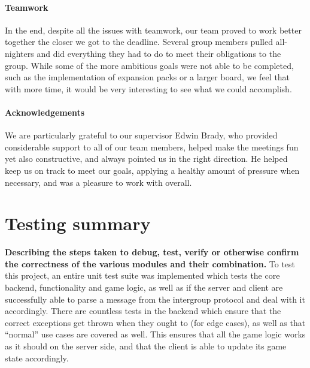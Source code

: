 \documentclass[a4paper,doc,draftfirst]{apa6}
\begin{document}
\paragraph{Teamwork}
In the end, despite all the issues with teamwork, our team proved to work better together the closer we got to the deadline. Several group members pulled all-nighters and did everything they had to do to meet their obligations to the group. While some of the more ambitious goals were not able to be completed, such as the implementation of expansion packs or a larger board, we feel that with more time, it would be very interesting to see what we could accomplish.   

\paragraph{Acknowledgements}
We are particularly grateful to our supervisor Edwin Brady, who provided considerable support to all of our team members, helped make the meetings fun yet also constructive, and always pointed us in the right direction. He helped keep us on track to meet our goals, applying a healthy amount of pressure when necessary, and was a pleasure to work with overall. 

\section{Testing summary}
\textbf{Describing the steps taken to debug, test, verify or otherwise confirm the correctness of the various modules and their combination.}
To test this project, an entire unit test suite was implemented which tests the core backend, functionality and game logic, as well as if the server and client are successfully able to parse a message from the intergroup protocol and deal with it accordingly. There are countless tests in the backend which ensure that the correct exceptions get thrown when they ought to (for edge cases), as well as that “normal” use cases are covered as well. This ensures that all the game logic works as it should on the server side, and that the client is able to update its game state accordingly.
\end{document}

